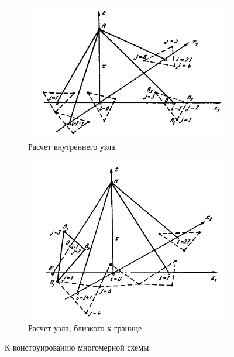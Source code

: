 \begin{figure}[ht]
\begin{subfigure}[b]{0.5\textwidth}
\centering
\includegraphics[width=\textwidth]{png/characteristics-2d-triangles-inner.png}
\caption{Расчет внутреннего узла.}
\end{subfigure}
\begin{subfigure}[b]{0.5\textwidth}
\centering
\includegraphics[width=\textwidth]{png/characteristics-2d-triangles-semi-border.png}
\caption{Расчет узла, близкого к границе.}
\end{subfigure}
\caption{К конструированию многомерной схемы.}
\label{pic:method_3d}
\end{figure}

